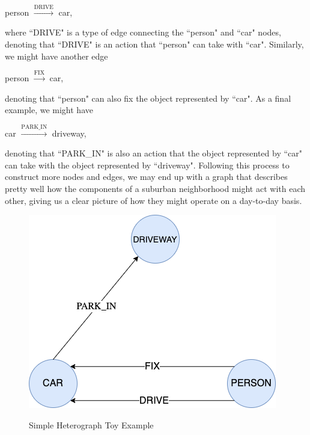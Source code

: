 \documentclass{article}
\theoremstyle{definition}
\begin{document}
\begin{center}
    person $\xrightarrow{\text{DRIVE}}$ car,
\end{center}

where ``DRIVE" is a type of edge connecting the ``person" and ``car" nodes, denoting that ``DRIVE" is an action that ``person" can take with ``car". Similarly, we might have another edge

\begin{center}
    person $\xrightarrow{\text{FIX}}$ car,
\end{center}

denoting that ``person" can also fix the object represented by ``car". As a final example, we might have

\begin{center}
    car $\xrightarrow{\text{PARK\_IN}}$ driveway,
\end{center}

denoting that ``PARK\_IN" is also an action that the object represented by ``car" can take with the object represented by ``driveway". Following this process to construct more nodes and edges, we may end up with a graph that describes pretty well how the components of a suburban neighborhood might act with each other, giving us a clear picture of how they might operate on a day-to-day basis.

\begin{figure}[hbt!]
\vspace{-0.125in}
\par
\begin{center}
\caption{Simple Heterograph Toy Example}
\vspace{0.1in}
\label{fig:simpleHetGraph}
\includegraphics[scale=0.4]{Figures/SimpleHetGraph.png}
\end{center}
\par
\vspace{-0.25in}
\medskip
\end{figure}
\end{document}

